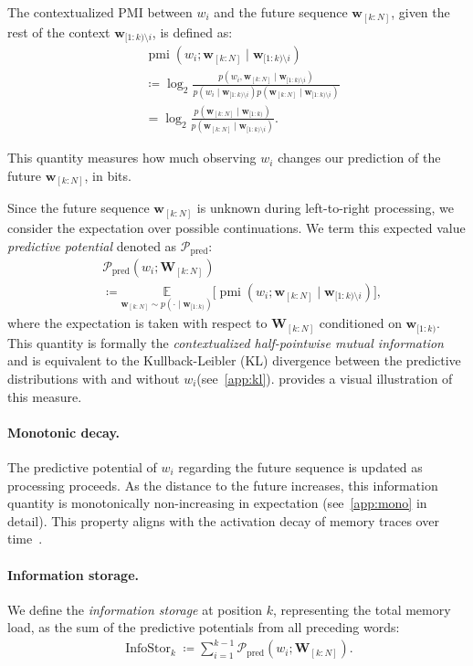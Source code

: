 \documentclass[11pt]{article}
\newcommand{\wseq}[2]{\ensuremath{\boldsymbol w_{[#1: #2]}}\xspace}
\newcommand{\Wseq}[2]{\ensuremath{\boldsymbol W_{[#1: #2]}}\xspace}
\newcommand{\curid}{\ensuremath{k}\xspace}
\newcommand{\sstartid}{\ensuremath{1}\xspace}
\newcommand{\sendid}{\ensuremath{N}\xspace}
\newcommand{\targetid}{\ensuremath{i}\xspace}
\newcommand{\wtarget}{\ensuremath{w_{\targetid}}\xspace}
\newcommand{\context}{\ensuremath{\boldsymbol w_{[\sstartid:\curid)}}\xspace}
\newcommand{\contextwotarget}{\ensuremath{\boldsymbol w_{[1:\curid)\setminus \targetid}}\xspace}
\newcommand{\future}{\ensuremath{\wseq{\curid}{\sendid}}\xspace}
\newcommand{\Future}{\ensuremath{\Wseq{\curid}{\sendid}}\xspace}
\newcommand{\logtwo}{\ensuremath{\log_{2}}\xspace}
\newcommand{\pmi}{\ensuremath{\operatorname{pmi}}\xspace}
\newcommand{\CHMI}{\ensuremath{\mathcal{P}_{\mathrm{pred}}}\xspace}
\newcommand{\chmi}[2]{\ensuremath{\CHMI(#1;#2)}\xspace}
\newcommand{\stor}[1]{\ensuremath{\operatorname{InfoStor}_{#1}}\xspace}
\newcommand{\condprob}[2]{\ensuremath{p(#1\mid #2)}\xspace}
\newcommand{\condpmi}[3]{\ensuremath{\pmi(#1;#2\mid #3)}\xspace}
\newcommand{\condE}[3]{\ensuremath{\underset{#1\sim\condprob{\cdot}{#2}}{\mathbb{E}}\!\big[#3\big]}\xspace}
\begin{document}
The contextualized PMI between \wtarget and the future sequence \future, given the rest of the context \contextwotarget, is defined as:
\begin{align}
    & \condpmi{\wtarget}{\future}{\contextwotarget} \\
    &\coloneqq \logtwo \frac{\condprob{\wtarget, \future}{\contextwotarget}}{\condprob{\wtarget}{\contextwotarget} \condprob{\future}{\contextwotarget}} \nonumber \\
    & = \logtwo \frac{\condprob{\future}{\context}}{\condprob{\future}{\contextwotarget}}. \nonumber
\end{align}

This quantity measures how much observing \wtarget changes our prediction of the future \future, in bits.


Since the future sequence \future is unknown during left-to-right processing, we consider the expectation over possible continuations.
We term this expected value \emph{predictive potential} denoted as \CHMI:
\begin{align}
    & \chmi{\wtarget}{\Future} \label{eq:predpotential}\\
    &\coloneqq \condE{\future}{\context}{\condpmi{\wtarget}{\future}{\contextwotarget}}, \nonumber
\end{align}
where the expectation is taken with respect to \Future conditioned on \context.
This quantity is formally the \emph{contextualized half-pointwise mutual information} and is equivalent to the Kullback-Leibler (KL) divergence between the predictive distributions with and without \wtarget (see~\cref{app:kl}).
 provides a visual illustration of this measure.


\paragraph{Monotonic decay.}
The predictive potential of \wtarget regarding the future sequence is updated as processing proceeds.
As the distance to the future increases, this information quantity is monotonically non-increasing in expectation (see~\cref{app:mono} in detail).
This property aligns with the activation decay of memory traces over time~\citep{lewis-vasishth-2005,lewis-etal-2006}.

\paragraph{Information storage.}
We define the \emph{information storage} at position \curid, representing the total memory load, as the sum of the predictive potentials from all preceding words:
\begin{align} \label{eq:info_storage}
    \stor{\curid} \coloneqq \sum_{\targetid=\sstartid}^{\curid-1} \chmi{\wtarget}{\Future}.
\end{align}
\end{document}
